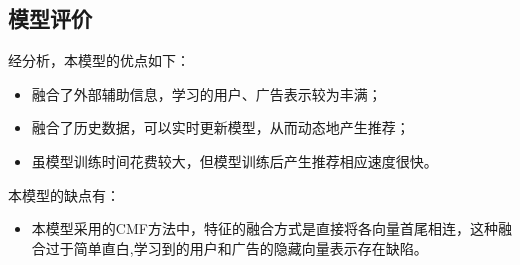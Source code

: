 \subsection{模型评价}

经分析，本模型的优点如下：
\begin{itemize}
    \item 融合了外部辅助信息，学习的用户、广告表示较为丰满；
    \item 融合了历史数据，可以实时更新模型，从而动态地产生推荐；
    \item 虽模型训练时间花费较大，但模型训练后产生推荐相应速度很快。
\end{itemize}

本模型的缺点有：

\begin{itemize}
    \item 本模型采用的CMF方法中，特征的融合方式是直接将各向量首尾相连，这种融合过于简单直白,学习到的用户和广告的隐藏向量表示存在缺陷。
\end{itemize}
